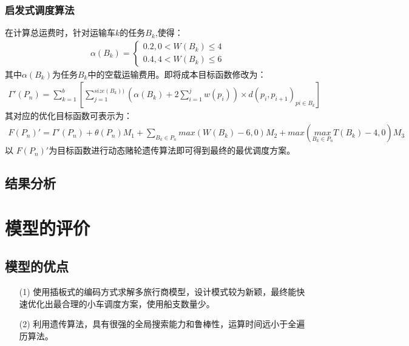 \documentclass{whutmod}
\begin{document}
  \subsubsection{启发式调度算法}
  在计算总运费时，针对运输车$k$的任务$B_k$,使得：
  \begin{gather}
  \alpha (B_k)=\left\{\begin{matrix}0.2,0<W(B_k)\leqslant4
  \\ 0.4,4<W(B_k)\leqslant6
  \end{matrix}\right.
  \end{gather}
  其中$\alpha (B_k)$为任务$B_k$中的空载运输费用。即将成本目标函数修改为：
  \begin{gather}
  \Gamma '(P_n)=\sum _{k=1}^b[\sum _{j=1}^{size(B_k))}(\alpha (B_k)+2\sum _{i=1}^jw(p_i))\times d(p_i,p_{i+1})_{pi\in B_k}]
  \end{gather}
  其对应的优化目标函数可表示为：
  \begin{gather}
  F(P_n)'= \Gamma '(P_n)+\theta(P_n)M_1+\sum_{B_k\in P_n}max( W (B_k)-6 ,0) M_2+max(\underset{B_k\in P_n}{max}T (B_k)-4,0)M_3
  \end{gather}
  以  $F(P_n)'$为目标函数进行动态赌轮遗传算法即可得到最终的最优调度方案。
  \subsection{结果分析}
  
  
  
  
  
  \section{模型的评价}
  \subsection{模型的优点}
  \begin{itemize}                                             
  	\item [(1)]使用插板式的编码方式求解多旅行商模型，设计模式较为新颖，最终能快速优化出最合理的小车调度方案，使用船支数量少。
  	
  	\item [(2)] 利用遗传算法，具有很强的全局搜索能力和鲁棒性，运算时间远小于全遍历算法。	
  \end{itemize}
\end{document}
